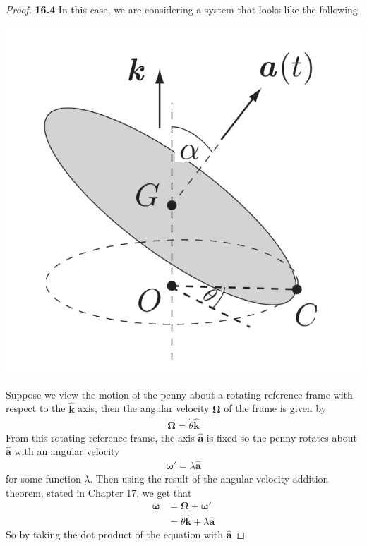 \documentclass[11pt]{article}
\newcommand{\hatk}{\bm{\hat{k}}}
\theoremstyle{definition}
\begin{document}
\cleardoublepage
\begin{proof}{\textbf{16.4}}
    In this case, we are considering a system that looks like the following
    \begin{center}
        \includegraphics[scale=0.4]{ch16-4.png}
    \end{center}
    Suppose we view the motion of the penny about a rotating reference frame
    with respect to the $\hatk$ axis, then the angular velocity $\bm{\Omega}$
    of the frame is given by
    \begin{align*}
        \bm{\Omega} = \dot{\theta}\hatk
    \end{align*}
    From this rotating reference frame, the axis $\bm{\hat{a}}$
    is fixed so the penny rotates about $\bm{\hat{a}}$ with an angular velocity
    \begin{align*}
        \bm{\omega'} = \lambda\bm{\hat{a}}
    \end{align*}
    for some function $\lambda$.
    Then using the result of the angular velocity addition theorem,
    stated in Chapter 17, we get that 
    \begin{align*}
        \bm{\omega} &= \bm{\Omega} + \bm{\omega'}\\
        &= \dot{\theta}\hatk + \lambda\bm{\hat{a}}
    \end{align*}
    So by taking the dot product of the equation with $\bm{\hat{a}}$

\end{proof}
\end{document}
